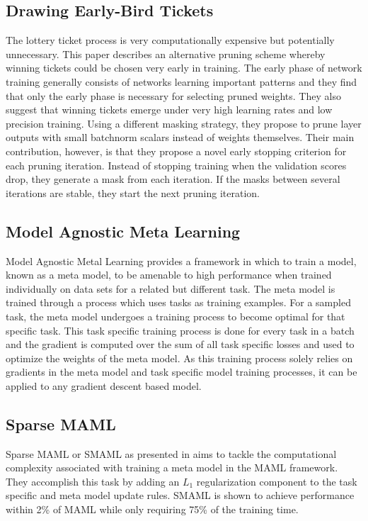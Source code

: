 \documentclass[twocolumn, 10pt]{article}
\begin{document}
\subsection{Drawing Early-Bird Tickets\cite{earlybird}}
The lottery ticket process is very computationally expensive but potentially unnecessary. This paper describes an alternative pruning scheme whereby winning tickets could be chosen very early in training. The early phase of network training generally consists of networks learning important patterns and they find that only the early phase is necessary for selecting pruned weights. They also suggest that winning tickets emerge under very high learning rates and low precision training. Using a different masking strategy, they propose to prune layer outputs with small batchnorm scalars instead of weights themselves. Their main contribution, however, is that they propose a novel early stopping criterion for each pruning iteration. Instead of stopping training when the validation scores drop, they generate a mask from each iteration. If the masks between several iterations are stable, they start the next pruning iteration.

\subsection{Model Agnostic Meta Learning \cite{finn2017modelagnostic}}
Model Agnostic Metal Learning provides a framework in which to train a model, known as a meta model, to be amenable to high performance when trained individually on data sets for a related but different task. The meta model is trained through a process which uses tasks as training examples. For a sampled task, the meta model undergoes a training process to become optimal for that specific task. This task specific training process is done for every task in a batch and the gradient is computed over the sum of all task specific losses and used to optimize the weights of the meta model. As this training process solely relies on gradients in the meta model and task specific model training processes, it can be applied to any gradient descent based model.

\subsection{Sparse MAML\cite{gai2019sparse}}
Sparse MAML or SMAML as presented in \cite{gai2019sparse} aims to tackle the computational complexity associated with training a meta model in the MAML framework. They accomplish this task by adding an $L_1$ regularization component to the task specific and meta model update rules. SMAML is shown to achieve performance within 2\% of MAML while only requiring 75\% of the training time. 
\end{document}
